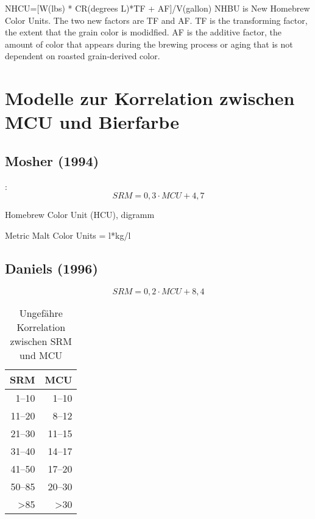 \documentclass[a4paper,parskip=half]{scrartcl}
\newcommand{\MCU}{\mathit{MCU}}
\newcommand{\SRM}{\mathit{SRM}}
\begin{document}
NHCU=[W(lbs) * CR(degrees L)*TF + AF]/V(gallon)
NHBU is New Homebrew Color Units. The two new factors are TF and AF. TF is the transforming factor, the
extent that the grain color is modidfied. AF is the additive factor, the amount of color that appears during the
brewing process or aging that is not dependent on roasted grain-derived color.

\section*{Modelle zur Korrelation zwischen MCU und Bierfarbe}


\subsection*{Mosher (1994)}

\parencite{Morey}:
\begin{equation}
\SRM = 0,3 \cdot \MCU + 4,7
\label{eq:mcumosher}
\end{equation}

Homebrew Color Unit (HCU), digramm
\parencite[34]{Mosher1994}

Metric Malt Color Units = l*kg/l
\parencite[258]{Mosher2015}

\subsection*{Daniels (1996)}

\parencite{Daniels1996}

\begin{equation}
\SRM = 0,2 \cdot \MCU + 8,4
\label{eq:mcudaniels}
\end{equation}

\begin{table}[H]
\centering
\begin{tabular}{rr}
\toprule
\multicolumn{1}{c}{\textbf{SRM}} & \multicolumn{1}{c}{\textbf{MCU}} \\
\midrule
1–10 & 1–10 \\
11–20 & 8–12 \\
21–30 & 11–15 \\
31–40 & 14–17 \\
41–50 & 17–20 \\
50–85 & 20–30 \\
>85 & >30 \\
\bottomrule
\end{tabular}
\caption{Ungefähre Korrelation zwischen SRM und MCU \parencite[61]{Daniels1996}}
\label{table:mcudaniels}
\end{table}
\end{document}
